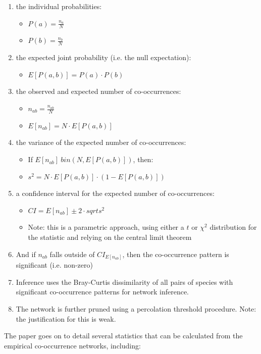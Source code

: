 \documentclass[12pt]{article}
\begin{document}
\begin{enumerate}
\item the individual probabilities: 
  \begin{itemize}
  \item $P(a) = \frac{n_a}{N}$
  \item $P(b) = \frac{n_b}{N}$
  \end{itemize}
\item the expected joint probability (i.e. the null expectation):
  \begin{itemize}
  \item $E[P(a,b)] = P(a) \cdot P(b)$
  \end{itemize}
\item the observed and expected number of co-occurrences:
  \begin{itemize}
  \item $n_{ab} = \frac{n_{ab}}{N}$
  \item $E[n_{ab}] = N \cdot E[P(a,b)]$
  \end{itemize}
\item the variance of the expected number of co-occurrences:
  \begin{itemize}
  \item If $E[n_{ab}] ~ bin(N,E[P(a,b)])$, then:
  \item $s^2 = N \cdot E[P(a,b)] \cdot (1 - E[P(a,b)])$ \cite{mccarthy2007}
  \end{itemize}
\item a confidence interval for the expected number of co-occurrences:
  \begin{itemize}
  \item $CI = E[n_{ab}] \pm 2 \cdot sqrt{s^2}$
  \item Note: this is a parametric approach, using either a $t$ or
    $\chi^2$ distribution for the statistic and relying on the central
    limit theorem
  \end{itemize}
\item And if $n_{ab}$ falls outside of $CI_{E[n_{ab}]}$, then the
  co-occurrence pattern is significant (i.e. non-zero)
\item Inference uses the Bray-Curtis dissimilarity of all pairs of species
  with significant co-occurrence patterns for network inference.
\item The network is further pruned using a percolation threshold
  procedure. Note: the justification for this is weak.
\end{enumerate}

The paper goes on to detail several statistics that can be calculated
from the empirical co-occurrence networks, including:
\end{document}
